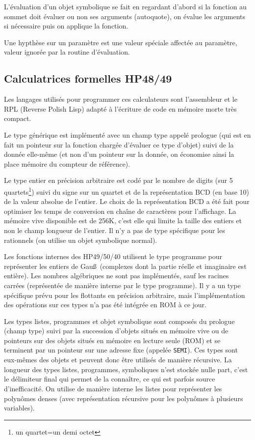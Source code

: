 \documentclass[a4paper,11pt]{book}
\begin{document}
\begin{giacjshere}
L'évaluation d'un objet symbolique se fait en regardant d'abord si
la fonction au sommet doit évaluer ou non ses arguments (autoquote),
on évalue les arguments si nécessaire puis on applique la fonction.

Une hypthèse sur un paramètre est une valeur spéciale
affectée au paramètre, valeur ignorée par la routine d'évaluation.


\subsection{Calculatrices formelles HP48/49}
Les langages utilis\'es pour programmer ces calculateurs sont l'assembleur
et le RPL (Reverse Polish Lisp) adapt\'e \`a l'\'ecriture de code
en m\'emoire morte tr\`es compact.

Le type générique est implémenté avec un champ type appelé prologue (qui est
en fait un pointeur sur la fonction chargée d'évaluer ce type d'objet)
suivi de la donnée elle-même (et non d'un pointeur sur la donnée, on
économise ainsi la place mémoire du compteur de référence).

Le type entier en précision arbitraire est codé par le nombre de digits 
(sur 5 quartets\footnote{un quartet=un demi octet}) suivi du signe sur un 
quartet et de la représentation BCD (en base 10) de la valeur absolue de 
l'entier. Le choix de la représentation BCD a été fait pour optimiser 
les temps de conversion en chaîne de caractères pour l'affichage. La mémoire
vive disponible est de 256K, c'est elle qui limite la taille des entiers 
et non le champ longueur de l'entier. Il n'y a pas de type spécifique 
pour les rationnels (on utilise un objet
symbolique normal). 

Les fonctions internes des HP49/50/40 utilisent 
le type programme pour représenter les entiers de Gau\ss\ (complexes
dont la partie réelle et imaginaire est entière).
Les nombres algébriques ne sont pas implémentés, sauf les racines carrées
(représentée de manière interne par le type programme). 
Il y a un type spécifique prévu pour les flottants en précision arbitraire, 
mais l'implémentation des opérations sur ces types
n'a pas été intégrée en ROM à ce jour. 

Les types listes, programmes et objet symbolique sont composés du prologue
(champ type) suivi par la succession d'objets situés en
mémoire vive ou de pointeurs sur des objets situés en mémoire en lecture 
seule (ROM) et se terminent par un pointeur sur une
adresse fixe (appelée \verb|SEMI|). Ces types sont eux-m\^emes des 
objets et peuvent donc \^etre utilis\'es de mani\`ere
r\'ecursive. La longueur des types listes, programmes, symboliques 
n'est stockée nulle part, c'est le délimiteur final
qui permet de la connaître, ce qui est parfois source d'inefficacité.
On utilise de manière interne les listes pour représenter les 
polyn\^omes denses (avec 
représentation récursive pour les polyn\^omes à plusieurs variables). 


\end{giacjshere}
\end{document}
